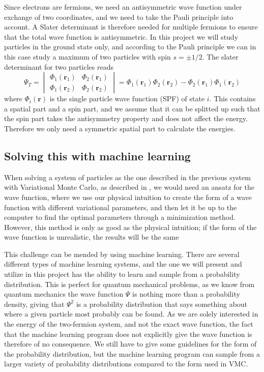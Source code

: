 \documentclass[norsk,a4paper,12pt]{article}
\begin{document}
Since electrons are fermions, we need an antisymmetric wave function under exchange of two coordinates, and we need to take the Pauli principle into account. A Slater determinant is therefore needed for multiple fermions to ensure that the total wave function is antisymmetric. In this project we will study particles in the ground state only, and according to the Pauli principle we can in this case study a maximum of two particles with spin $s=\pm 1/2$. The slater determinant for two particles reads
\begin{equation}
\Psi_T=
\begin{vmatrix}
\Phi_1(\boldsymbol{r}_1) & \Phi_2(\boldsymbol{r}_1)\\
\Phi_1(\boldsymbol{r}_2) & \Phi_2(\boldsymbol{r}_2)
\end{vmatrix}
=\Phi_1(\boldsymbol{r}_1)\Phi_2(\boldsymbol{r}_2)-\Phi_2(\boldsymbol{r}_1)\Phi_1(\boldsymbol{r}_2)
\end{equation}
where $\Phi_i(\boldsymbol{r})$ is the single particle wave function (SPF) of state $i$. This contains a spatial part and a spin part, and we assume that it can be splitted up such that the spin part takes the antisymmetry property and does not affect the energy. Therefore we only need a symmetric spatial part to calculate the energies.

\subsection{Solving this with machine learning}
When solving a system of particles as the one described in the previous system with Variational Monte Carlo, as described in \cite{Nordhagen}, we would need an ansatz for the wave function, where we use our physical intuition to create the form of a wave function with different variational parameters, and then let it be up to the computer to find the optimal parameters through a minimization method. However, this method is only as good as the physical intuition; if the form of the wave function is unrealistic, the results will be the same
\par 
\vspace{3mm}
This challenge can be mended by using machine learning. There are several different types of machine learning systems, and the one we will present and utilize in this project has the ability to learn and sample from a probability distribution. This is perfect for quantum mechanical problems, as we know from quantum mechanics the wave function $\Psi$ is nothing more than a probability density, giving that $\Psi^2$ is a probability distribution that says something about where a given particle most probably can be found. As we are solely interested in the energy of the two-fermion system, and not the exact wave function, the fact that the machine learning program does not explicitly give the wave function is therefore of no consequence. We still have to give some guidelines for the form of the probability distribution, but the machine learning program can sample from a larger variety of probability distributions compared to the form used in VMC.
\end{document}
